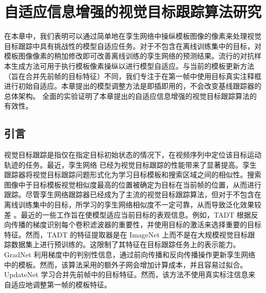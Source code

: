 \chapter{自适应信息增强的视觉目标跟踪算法研究}\label{chap:MTP}
在本章中，我们表明可以通过简单地在孪生网络中操纵模板图像的像素来处理视觉目标跟踪中具有挑战性的模型自适应任务。对于不包含在离线训练集中的目标，对模板图像像素的稍加修改即可改善离线训练的孪生网络的预测结果。流行的对抗样本生成方法可用于执行模板像素操纵以进行模型自适应。与当前的模板更新方法（旨在合并先前帧的目标特征）不同，我们专注于在第一帧中使用目标真实注释框进行初始自适应。本章提出的模型调整方法是即插即用的，不会改变基线跟踪器的总体架构。
全面的实验证明了本章提出的自适应信息增强的视觉目标跟踪算法的有效性。

\section{引言}
视觉目标跟踪是指仅在指定目标初始状态的情况下，在视频序列中定位该目标运动轨迹的任务。最近，孪生网络 \cite{danelljan2019atom, SiamFC} 已经为视觉目标跟踪的性能带来了显著提高。孪生跟踪器将视觉目标跟踪问题形式化为学习目标模板和搜索区域之间的相似性。搜索图像中于目标模板视觉相似度最高的位置被确定为目标在当前帧的位置，从而进行跟踪。尽管孪生网络跟踪器已经成为了主流的视觉目标跟踪算法，但对于不包含在离线训练集中的目标，所学习的孪生网络相似度不一定可靠，从而导致泛化效果较差 \cite{Bhat_2019_ICCV}。最近的一些工作旨在使模型适应当前目标的表观信息。例如，TADT \cite{Li_2019_CVPR} 根据反向传播的梯度识别每个卷积滤波器的重要性，并使用目标的激活来选择重要的目标特征。然而，TADT 的特征提取器是在 ImageNet \cite{VID} 上而不是在大规模视觉目标跟踪数据集上进行预训练的。这限制了其特征在目标跟踪任务上的表示能力。GradNet \cite{Li_2019_ICCV} 利用梯度中的判别性信息，通过前向传播和反向传播操作更新孪生网络中的模板。然而，该算法采用的额外子网会增加计算成本，并且容易过拟合。UpdateNet \cite{Zhang_2019_ICCV} 学习合并先前帧中的目标特征。然而，该方法不使用真实标注信息来自适应地调整第一帧的模板特征。

